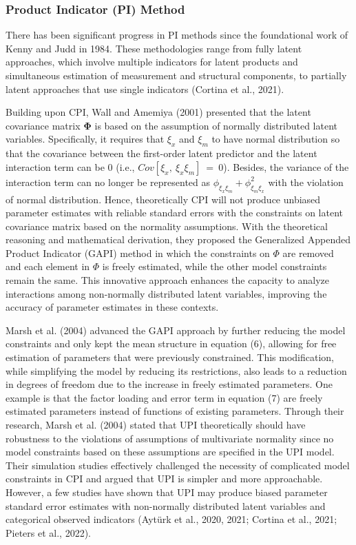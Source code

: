 \documentclass[
  man]{apa6}
\begin{document}
\hypertarget{product-indicator-pi-method}{%
\subsubsection{Product Indicator (PI) Method}\label{product-indicator-pi-method}}

There has been significant progress in PI methods since the foundational work of Kenny and Judd in 1984. These methodologies range from fully latent approaches, which involve multiple indicators for latent products and simultaneous estimation of measurement and structural components, to partially latent approaches that use single indicators (Cortina et al., 2021).

Building upon CPI, Wall and Amemiya (2001) presented that the latent covariance matrix \(\boldsymbol{\Phi}\) is based on the assumption of normally distributed latent variables. Specifically, it requires that \(\xi_{x}\) and \(\xi_{m}\) to have normal distribution so that the covariance between the first-order latent predictor and the latent interaction term can be 0 (i.e., \(Cov[\xi_{x}, \ \xi_{x}\xi_{m}] \ = \ 0\)). Besides, the variance of the interaction term can no longer be represented as \(\phi_{\xi_{x}\xi_{m}} + \phi_{\xi_{m}\xi_{x}}^2\) with the violation of normal distribution. Hence, theoretically CPI will not produce unbiased parameter estimates with reliable standard errors with the constraints on latent covariance matrix based on the normality assumptions. With the theoretical reasoning and mathematical derivation, they proposed the Generalized Appended Product Indicator (GAPI) method in which the constraints on \({\Phi}\) are removed and each element in \({\Phi}\) is freely estimated, while the other model constraints remain the same. This innovative approach enhances the capacity to analyze interactions among non-normally distributed latent variables, improving the accuracy of parameter estimates in these contexts.

Marsh et al. (2004) advanced the GAPI approach by further reducing the model constraints and only kept the mean structure in equation (6), allowing for free estimation of parameters that were previously constrained. This modification, while simplifying the model by reducing its restrictions, also leads to a reduction in degrees of freedom due to the increase in freely estimated parameters. One example is that the factor loading and error term in equation (7) are freely estimated parameters instead of functions of existing parameters. Through their research, Marsh et al. (2004) stated that UPI theoretically should have robustness to the violations of assumptions of multivariate normality since no model constraints based on these assumptions are specified in the UPI model. Their simulation studies effectively challenged the necessity of complicated model constraints in CPI and argued that UPI is simpler and more approachable. However, a few studies have shown that UPI may produce biased parameter standard error estimates with non-normally distributed latent variables and categorical observed indicators (Aytürk et al., 2020, 2021; Cortina et al., 2021; Pieters et al., 2022).
\end{document}
